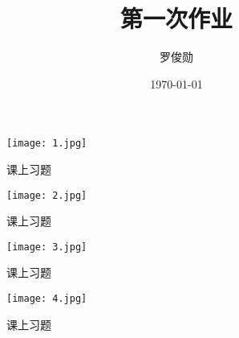 \documentclass[12pt, a4paper, oneside]{ctexart}
\title{\huge\textbf{第一次作业}}
\author{罗俊勋}
\date{\today}
\begin{document}
\maketitle



\begin{figure}[p]

    \centerline{\texttt{[image: 1.jpg]}}
    \caption{课上习题}
    \label{figure}

\end{figure}
\begin{figure}[p]

    \centerline{\texttt{[image: 2.jpg]}}
    \caption{课上习题}
    \label{figure}

\end{figure}
\begin{figure}[p]

    \centerline{\texttt{[image: 3.jpg]}}
    \caption{课上习题}
    \label{figure}

\end{figure}
\begin{figure}[p]

    \centerline{\texttt{[image: 4.jpg]}}
    \caption{课上习题}
    \label{figure}

\end{figure}
\end{document}
